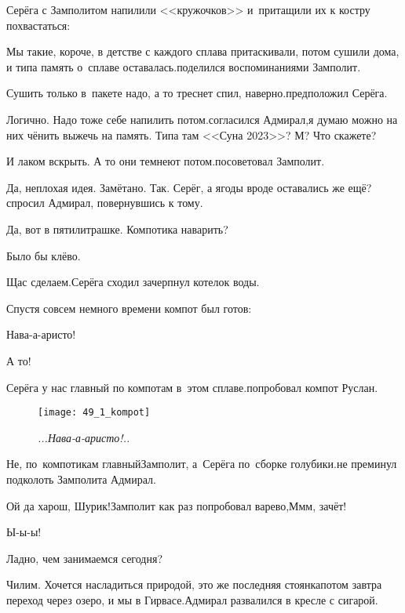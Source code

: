 Серёга с Замполитом напилили <<кружочков>> и~притащили их к костру похвастаться:

\diagdash Мы такие, короче, в детстве с каждого сплава притаскивали, потом сушили дома, и типа память о~сплаве оставалась.\mdash поделился воспоминаниями Замполит.

\diagdash Сушить только в~пакете надо, а то треснет спил, наверно.\mdash предположил Серёга.

\diagdash Логично. Надо тоже себе напилить потом.\mdash согласился Адмирал,\mdash я думаю можно на них чё\sdash нить выжечь на память. Типа там <<Суна 2023>>? М? Что скажете?

\diagdash И лаком вскрыть. А то они темнеют потом.\mdash посоветовал Замполит.

\diagdash Да, неплохая идея. Замётано. Так. Серёг, а ягоды вроде оставались же ещё?\mdash спросил Адмирал, повернувшись к тому.

\diagdash Да, вот в пятилитрашке. Компотика наварить?

\diagdash Было бы клёво.

\diagdash Щас сделаем.\mdash Серёга сходил зачерпнул котелок воды.

Спустя совсем немного времени компот был готов:

\diagdash Нава-а-аристо!

\diagdash А то!

\diagdash Серёга у нас главный по компотам в~этом сплаве.\mdash попробовал компот Руслан.

\begin{wrapfigure}[10]{r}{0.51\textwidth}
	\centering
	\texttt{[image: 49\_1\_kompot]}
	\caption{\small\textit{...Нава-а-аристо!..}}
\end{wrapfigure}

\diagdash Не, по~компотикам главный\mdash Замполит, а~Серёга по~сборке голубики.\mdash не преминул подколоть Замполита Адмирал.

\diagdash Ой да харош, Шурик!\mdash Замполит как раз попробовал варево,\mdash М\sdash м\sdash м, зачёт!

\diagdash Ы-ы-ы!

\newpage
\diagdash Ладно, чем занимаемся сегодня?

\diagdash Чилим. Хочется насладиться природой, это же последняя стоянка\mdash потом завтра переход через озеро, и мы в Гирвасе.\mdash Адмирал развалился в кресле с сигарой.

